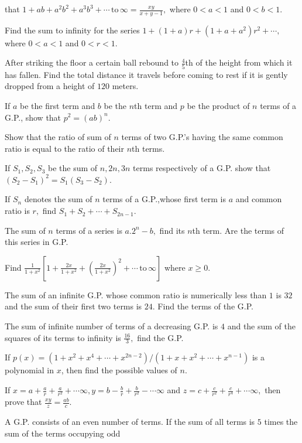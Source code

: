   that $1 + ab + a^2b^2 + a^3b^3 + \cdots\,\text{to}\,\infty = \frac{xy}{x + y - 1},$ where $0<a< 1$ and $0<b<1$.
\item Find the sum to infinity for the series $1 + (1 + a)r + (1 + a + a^2)r^2 + \cdots,$ where $0<a<1$ and $0<r<1$.
\item After striking the floor a certain ball rebound to $\frac{4}{5}$th of the height from which it has fallen. Find the total
  distance it travels before coming to rest if it is gently dropped from a height of $120$ meters.
\item If $a$ be the first term and $b$ be the $n$th term and $p$ be the product of $n$ terms of a G.P., show that $p^2 = (ab)^n$.
\item Show that the ratio of sum of $n$ terms of two G.P.'s having the same common ratio is equal to the ratio of their $n$th
  terms.
\item If $S_1, S_2, S_3$ be the sum of $n, 2n, 3n$ terms respectively of a G.P. show that $(S_2 - S_1)^2 = S_1(S_3 - S_2)$.
\item If $S_n$ denotes the sum of $n$ terms of a G.P.,whose first term is $a$ and common ratio is $r,$ find $S_1 + S_2 +  \cdots +
  S_{2n - 1}$.
\item The sum of $n$ terms of a series is $a.2^n - b,$ find its $n$th term. Are the terms of this series in G.P.
\item Find $\frac{1}{1 + x^2}\left[1 + \frac{2x}{1 + x^2} + \left(\frac{2x}{1 + x^2}\right)^2 + \cdots\,\text{to}\,\infty\right]$
  where $x\geq 0$.
\item The sum of an infinite G.P. whose common ratio is numerically less than $1$ is $32$ and the sum of their first two
  terms is $24.$ Find the terms of the G.P.
\item The sum of infinite number of terms of a decreasing G.P. is $4$ and the sum of the squares of its terms to infinity
  is $\frac{16}{3},$ find the G.P.
\item If $p(x) = (1 + x^2 + x^4 + \cdots + x^{2n - 2})/(1 + x + x^2 + \cdots + x^{n - 1})$ is a polynomial in $x$, then
  find the possible values of $n$.
\item If $x = a + \frac{a}{r} + \frac{a}{r^2} + \cdots \infty, y = b - \frac{b}{r} + \frac{b}{r^2} - \cdots \infty$ and $z
  = c + \frac{c}{r^2} + \frac{c}{r^4} + \cdots \infty,$ then prove that $\frac{xy}{z} = \frac{ab}{c}$.
\item A G.P. consists of an even number of terms. If the sum of all terms is $5$ times the sum of the terms occupying odd
